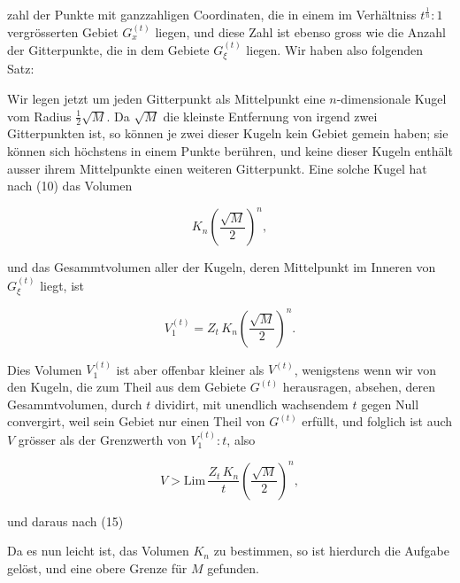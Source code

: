 zahl der Punkte mit ganzzahligen Coordinaten, die in einem im
Verhältniss $t^{\frac1n} : 1$ vergrösserten Gebiet $G_x^{(t)}$
liegen, und diese Zahl ist ebenso gross wie die Anzahl der
Gitterpunkte, die in dem Gebiete $G_\xi^{(t)}$ liegen. Wir haben
also folgenden Satz:



Wir legen jetzt um jeden Gitterpunkt als Mittelpunkt eine
$n$-dimensionale Kugel vom Radius $\frac12\sqrt{M}$. Da $\sqrt{M}$
die kleinste Entfernung von irgend zwei Gitterpunkten ist, so können
je zwei dieser Kugeln kein Gebiet gemein haben; sie können sich
höchstens in einem Punkte berühren, und keine dieser Kugeln enthält
ausser ihrem Mittelpunkte einen weiteren Gitterpunkt. Eine solche
Kugel hat nach (10) das Volumen

\[
K_n \left(\frac{\sqrt{M}}{2}\right)^{n},
\]

und das Gesammtvolumen aller der Kugeln, deren Mittelpunkt im
Inneren von $G_\xi^{(t)}$ liegt, ist

\[
V_1^{(t)} = Z_t\, K_n \left(\frac{\sqrt{M}}{2}\right)^{n}.
\]

Dies Volumen $V_1^{(t)}$ ist aber offenbar kleiner als $V^{(t)}$,
wenigstens wenn wir von den Kugeln, die zum Theil aus dem Gebiete
$G^{(t)}$ herausragen, absehen, deren Gesammtvolumen, durch $t$
dividirt, mit unendlich wachsendem $t$ gegen Null convergirt, weil
sein Gebiet nur einen Theil von $G^{(t)}$ erfüllt, und folglich ist
auch $V$ grösser als der Grenzwerth von $V_1^{(t)} : t$, also

\[
V > \mathrm{Lim}\, \frac{Z_t\, K_n}{t} \left(\frac{\sqrt{M}}{2}\right)^{n},
\]

und daraus nach (15)


Da es nun leicht ist, das Volumen $K_n$ zu bestimmen, so ist
hierdurch die Aufgabe gelöst, und eine obere Grenze für $M$
gefunden.
